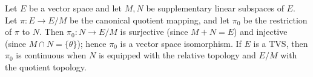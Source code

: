 Let $E$ be a vector space and let $M, N$ be supplementary linear subspaces of $E$. Let $\pi \colon E \to E/M$ be the canonical quotient mapping, and let $\pi_0$ be the restriction of $\pi$ to $N$. Then $\pi_0 \colon N \to E/M$ is surjective (since $M + N = E$) and injective (since $M \cap N = \{\theta\}$); hence $\pi_0$ is a vector space isomorphism. If $E$ is a TVS, then $\pi_0$ is continuous when $N$ is equipped with the relative topology and $E/M$ with the quotient topology.
